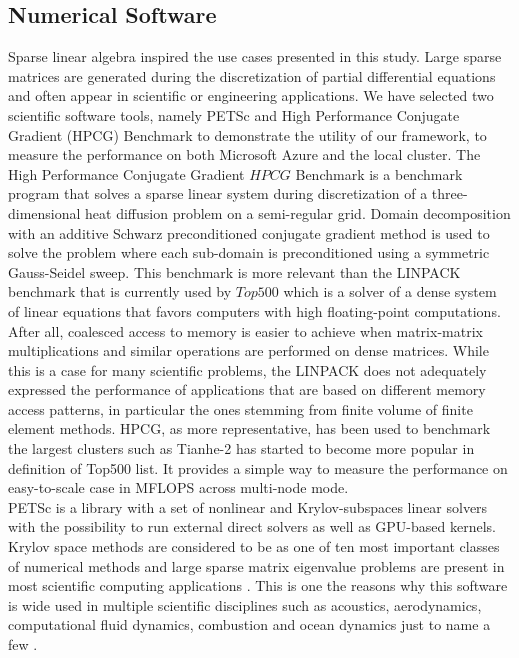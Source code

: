 \documentclass[a4paper,twoside]{article}
\begin{document}
\subsection{Numerical Software}
\label{sec:numerical}

Sparse linear algebra inspired the use cases presented in this study. Large sparse matrices are generated during the discretization of partial differential equations and often appear in scientific or engineering applications. We have selected two scientific software tools, namely PETSc and High Performance Conjugate Gradient (HPCG) Benchmark to demonstrate the utility of our framework, to measure the performance on both Microsoft Azure and the local cluster. 
The High Performance Conjugate Gradient \(HPCG\) Benchmark \cite{Heroux2013} is a benchmark program that solves a sparse linear system during discretization of a three-dimensional heat diffusion problem on a semi-regular grid. Domain decomposition with an additive Schwarz preconditioned conjugate gradient method is used to solve the problem where each sub-domain is preconditioned using a symmetric Gauss-Seidel sweep. This benchmark is more relevant than the LINPACK benchmark that is currently used by $Top500$ which is a solver of a dense system of linear equations that favors computers with high floating-point computations. After all, coalesced access to memory is easier to achieve when matrix-matrix multiplications and similar operations are performed on dense matrices. While this is a case for many scientific problems, the LINPACK does not adequately expressed the performance of applications that are based on different memory access patterns, in particular the ones stemming from finite volume of finite element methods. HPCG, as more representative, has been used to benchmark the largest clusters such as Tianhe-2 \cite{Xianyi2014} has started to become more popular in definition of Top500 list. It provides a simple way to measure the performance on easy-to-scale case in MFLOPS across multi-node mode. \\
PETSc is a library with a set of nonlinear and Krylov-subspaces linear solvers with the possibility to run external direct solvers as well as GPU-based kernels. Krylov space methods are considered to be as one of ten most important classes of numerical methods and large sparse matrix eigenvalue problems are present in most scientific computing applications \cite{Gutknecht2005}. This is one the reasons why this software is wide used in multiple scientific disciplines such as acoustics, aerodynamics, computational fluid dynamics, combustion and ocean dynamics just to name a few \cite{petsc-efficient}.\\
\end{document}
